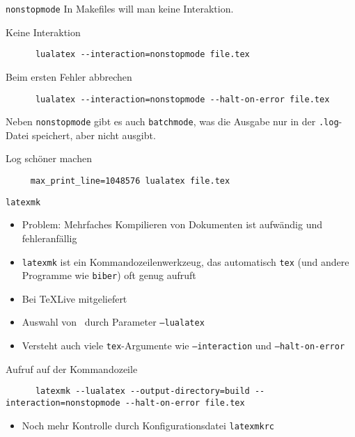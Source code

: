 
\begin{frame}[fragile]{\texttt{nonstopmode}}
  In Makefiles will man keine Interaktion.

  \begin{block}{Keine Interaktion}
    \begin{verbatim}
      lualatex --interaction=nonstopmode file.tex
    \end{verbatim}
  \end{block}

  \begin{block}{Beim ersten Fehler abbrechen}
    \begin{verbatim}
      lualatex --interaction=nonstopmode --halt-on-error file.tex
    \end{verbatim}
  \end{block}

  Neben \texttt{nonstopmode} gibt es auch \texttt{batchmode}, was die Ausgabe nur in der \texttt{.log}-Datei speichert, aber nicht ausgibt.

  \begin{block}{Log schöner machen}
    \begin{verbatim}
     max_print_line=1048576 lualatex file.tex
    \end{verbatim}
  \end{block}
\end{frame}

\begin{frame}[fragile]{
  \texttt{latexmk}
  \hfill
}
  \begin{itemize}
    \item Problem: Mehrfaches Kompilieren von Dokumenten ist aufwändig und fehleranfällig
    \item \texttt{latexmk} ist ein Kommandozeilenwerkzeug, das automatisch \texttt{tex} (und andere Programme wie \texttt{biber}) oft genug aufruft
    \item Bei TeXLive mitgeliefert
    \item Auswahl von \LuaLaTeX\ durch Parameter \texttt{--lualatex}
    \item Versteht auch viele \texttt{tex}-Argumente wie \texttt{--interaction} und \texttt{--halt-on-error}
  \end{itemize}

  \begin{block}{Aufruf auf der Kommandozeile}
    \begin{verbatim}
      latexmk --lualatex --output-directory=build --interaction=nonstopmode --halt-on-error file.tex
    \end{verbatim}
  \end{block}

  \begin{itemize}
    \item Noch mehr Kontrolle durch Konfigurationsdatei \texttt{latexmkrc}
  \end{itemize}
\end{frame}

